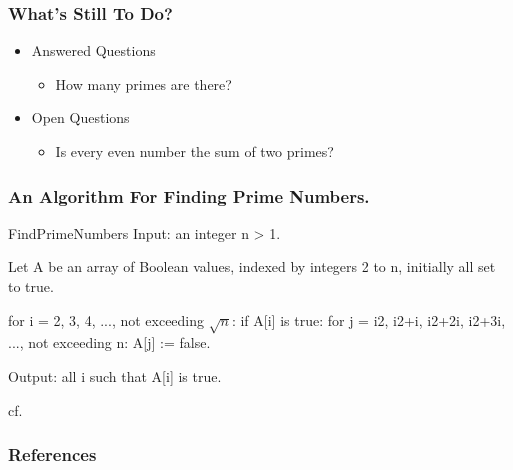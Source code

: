 \documentclass{beamer}
\begin{document}
\begin{frame}[t]
  \frametitle{What's Still To Do?}
  \begin{itemize}
    \item Answered Questions
    \begin{itemize}
      \item How many primes are there?
    \end{itemize}
    \item Open Questions
    \begin{itemize}
      \item Is every even number the sum of two primes?
    \end{itemize}
  \end{itemize}
\end{frame}

\begin{frame}
  \frametitle{An Algorithm For Finding Prime Numbers.}
  \begin{Code}{FindPrimeNumbers}
Input: an integer n > 1.

Let A be an array of Boolean values, indexed by integers 2 to n,
initially all set to true.

for i = 2, 3, 4, ..., not exceeding $\sqrt n$:
  if A[i] is true:
    for j = i2, i2+i, i2+2i, i2+3i, ..., not exceeding n:
      A[j] := false.

Output: all i such that A[i] is true.
  \end{Code}
  cf. \cite{wikipedia:sieve}
\end{frame}


\nocite{*}
\begin{frame}[allowframebreaks]
  \frametitle{References}
  \printbibliography
\end{frame}
\end{document}
